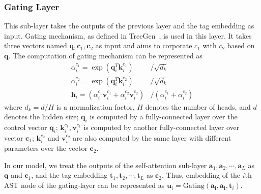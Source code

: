 \subsubsection{{Gating Layer}}
This sub-layer takes the outputs of the previous layer and the tag embedding as input. %
Gating mechanism, as defined in TreeGen~\cite{treegen}, is used in this layer. It takes three vectors named $\bm{q}, \bm{c}_1, \bm{c}_2$ as input and aims to corporate $c_1$ with $c_2$ based on $\bm{q}$. The computation of gating mechanism can be represented as 
\begin{align}
    \alpha_i^{c_1} = \exp(\bm{q}_i^T\bm{k}_i^{c_1})&/\sqrt{d_k}\\
\alpha_i^{c_2} = \exp(\bm{q}_i^T\bm{k}_i^{c_2})&/\sqrt{d_k}\\
    \bm{h}_i = (\alpha_i^{c_1}\bm{v}_i^{c_1} + \alpha_i^{c_2}\bm{v}_i^{c_2})&/(\alpha_i^{c_1} + \alpha_i^{c_2})
    \label{eq:gate}
\end{align}
where $d_k = d / H$ is a normalization factor, $H$ denotes the number of heads, and $d$ denotes the hidden size; $\bm{q}_i$ is computed by a fully-connected layer over the control vector $\bm{q}_i$; $\bm{k}_i^{c_1}, \bm{v}_i^{c_1}$ is computed by another fully-connected layer over vector $\bm{c}_1$; $\bm{k}_i^{c_2}$ and $\bm{v}_i^{c_2}$ are also computed by the same layer with different parameters over the vector $\bm{c}_2$. 

In our model, we treat the outputs of the self-attention sub-layer $\bm{a}_1, \bm{a}_2, \cdots{}, \bm{a}_L$ as $\bm{q}$ and $\bm{c}_1$, and the tag embedding $\bm{t}_1, \bm{t}_2, \cdots{}, \bm{t}_L$ as $\bm{c}_2$. Thus, embedding of the $i$th AST node of the gating-layer can be represented as $\bm{u}_i = \text{Gating}(\bm{a_i}, \bm{a_i}, \bm{t}_i)$. %
 
